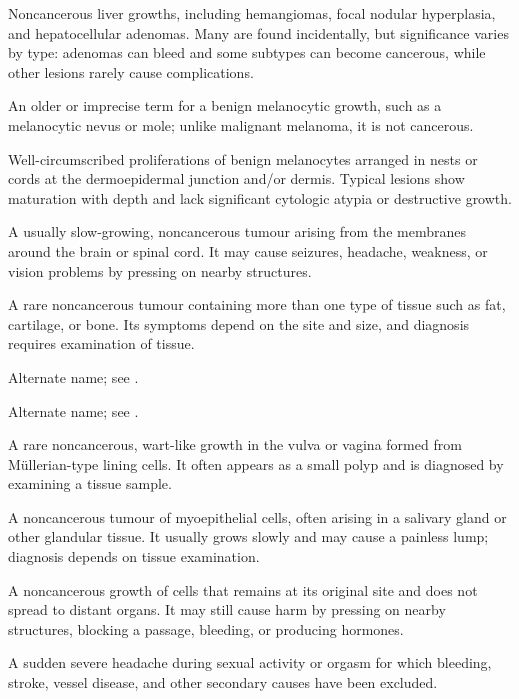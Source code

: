  Noncancerous liver growths, including hemangiomas, focal nodular hyperplasia, and hepatocellular adenomas. Many are found incidentally, but significance varies by type: adenomas can bleed and some subtypes can become cancerous, while other lesions rarely cause complications.

 An older or imprecise term for a benign melanocytic growth, such as a melanocytic nevus or mole; unlike malignant melanoma, it is not cancerous.

 Well-circumscribed proliferations of benign melanocytes arranged in nests or cords at the dermoepidermal junction and/or dermis. Typical lesions show maturation with depth and lack significant cytologic atypia or destructive growth.

 A usually slow-growing, noncancerous tumour arising from the membranes around the brain or spinal cord. It may cause seizures, headache, weakness, or vision problems by pressing on nearby structures.

 A rare noncancerous tumour containing more than one type of tissue such as fat, cartilage, or bone. Its symptoms depend on the site and size, and diagnosis requires examination of tissue.

 Alternate name; see .

 Alternate name; see .

 A rare noncancerous, wart-like growth in the vulva or vagina formed from Müllerian-type lining cells. It often appears as a small polyp and is diagnosed by examining a tissue sample.

 A noncancerous tumour of myoepithelial cells, often arising in a salivary gland or other glandular tissue. It usually grows slowly and may cause a painless lump; diagnosis depends on tissue examination.

 A noncancerous growth of cells that remains at its original site and does not spread to distant organs. It may still cause harm by pressing on nearby structures, blocking a passage, bleeding, or producing hormones.

 A sudden severe headache during sexual activity or orgasm for which bleeding, stroke, vessel disease, and other secondary causes have been excluded.

